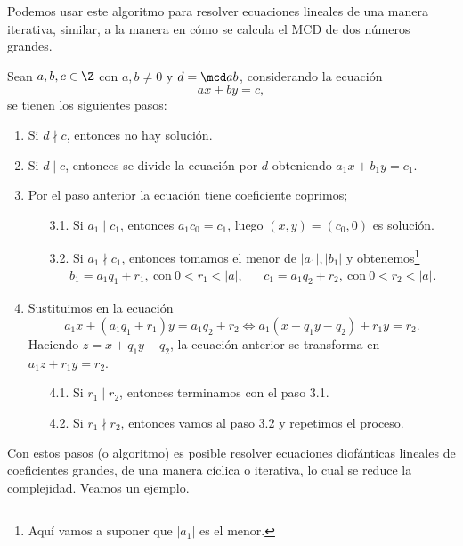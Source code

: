 Podemos usar este algoritmo para resolver ecuaciones lineales de una manera iterativa, similar, a la manera en cómo
se calcula el MCD de dos números grandes.

Sean $a,b, c \in \Z$ con $a,b \neq 0$ y $d = \mcd a b$, considerando la ecuación
\[
    ax + by = c,
\]
se tienen los siguientes pasos:
\begin{enumerate}
    \item Si $d\nmid c$, entonces no hay solución.
    \item Si $d \mid c$, entonces se divide la ecuación por $d$ obteniendo $a_1 x + b_1 y = c_1$.
    \item Por el paso anterior la ecuación tiene coeficiente coprimos;
    \begin{enumerate}
        \item[3.1.] Si $a_1 \mid c_1$, entonces $a_1 c_0 = c_1$, luego $(x,y) = (c_0, 0)$ es solución.
        \item[3.2.] Si $a_1 \nmid c_1$, entonces tomamos el menor de $|a_1|, |b_1|$ y obtenemos\footnote{Aquí vamos a suponer que $|a_1|$ es el menor.}
        \begin{align*}
            b_1 = a_1 q_1 + r_1,\ \text{con}\ 0<r_1<|a|, && c_1 = a_1 q_2 + r_2,\ \text{con}\ 0 < r_2 < |a|.
        \end{align*}
    \end{enumerate}
    \item Sustituimos en la ecuación
    \[
        a_1 x + (a_1 q_1 + r_1) y = a_1 q_2 + r_2 \iff a_1 (x + q_1 y - q_2) + r_1 y = r_2.
    \]
    Haciendo $z = x + q_1 y - q_2$, la ecuación anterior se transforma en $a_1 z + r_1 y = r_2$.
    \begin{enumerate}
        \item[4.1.] Si $r_1 \mid r_2$, entonces terminamos con el paso 3.1.
        \item[4.2.] Si $r_1 \nmid r_2$, entonces vamos al paso 3.2 y repetimos el proceso.
    \end{enumerate}
\end{enumerate}

Con estos pasos (o algoritmo) es posible resolver ecuaciones diofánticas lineales de coeficientes grandes, de una manera
cíclica o iterativa, lo cual se reduce la complejidad.
Veamos un ejemplo.

